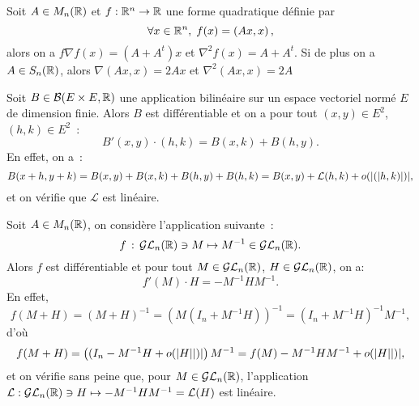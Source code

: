 \begin{exemple}
Soit \(A\in M_n(\mathbb{R})\) et \(f:\mathbb{R}^n\to\mathbb{R}\) une forme quadratique définie par 
\begin{equation*}
\forall x\in\mathbb{R}^n,\; f(x) = \left( Ax,x\right),
\end{equation*}
alors on a \(f\nabla f(x) = (A + A^{t})x\) et \(\nabla^2 f(x) = A + A^{t}\). Si de plus on a \(A\in S_n(\mathbb{R})\), alors \(\nabla \left(Ax,x\right) = 2Ax\) et \(\nabla^2 \left(Ax,x\right) = 2A\)
\end{exemple}
\begin{exemple}
Soit \(B\in \mathcal{B}(E\times E, \mathbb{R})\) une application bilinéaire sur un espace vectoriel normé \(E\) de dimension finie. Alors \(B\) est différentiable et on a pour tout \((x,y) \in E^2\), \((h,k)\in E^2\)~:
\begin{equation*}
B'(x,y)\cdot(h,k) = B(x, k) + B(h, y).
\end{equation*}
En effet, on a~:
\begin{equation*}
B(x+h, y+k) = B(x, y) + B(x, k) + B(h, y) + B(h, k) = B(x, y) + \mathcal{L}(h,k) + o(\mathopen{}\left|(\right|\mathclose{}h,k)\mathopen{}\left|)\right|\mathclose{},
\end{equation*}
et on vérifie que \(\mathcal{L}\) est linéaire.\\
\end{exemple}

\begin{exemple}
Soit \(A\in M_n(\mathbb{R})\), on considère l'application suivante~:
\begin{equation*}
f\,:\, \mathcal{GL}_n(\mathbb{R}) \ni M \mapsto M^{-1}\in \mathcal{GL}_n(\mathbb{R}).
\end{equation*}
Alors \(f\) est différentiable et pour tout \(M\in \mathcal{GL}_n(\mathbb{R})\), \(H\in \mathcal{GL}_n(\mathbb{R})\), on a:
\begin{equation*}
f'(M)\cdot H = -M^{-1}HM^{-1}.
\end{equation*}
En effet,
\begin{equation*}
f(M+H) = (M+H)^{-1} = \left(M^{}(I_n + M^{-1}H)\right)^{-1} = (I_n + M^{-1}H)^{-1}M^{-1},
\end{equation*}
d'où
\begin{equation*}
f(M+H) = \left( (I_n - M^{-1}H + o(\mathopen{}\left|H\right|\mathclose{}\mathopen{}\left|)\right|\mathclose{}  \right)M^{-1} = f(M)  - M^{-1}HM^{-1} + o(\mathopen{}\left|H\right|\mathclose{}\mathopen{}\left|)\right|\mathclose{},
\end{equation*}
et on vérifie sans peine que, pour \(M\in\mathcal{GL}_n(\mathbb{R})\),  l'application \(\mathcal{L}: \mathcal{GL}_n(\mathbb{R}) \ni H \mapsto - M^{-1}HM^{-1} = \mathcal{L}(H)\) est linéaire.\\
\end{exemple}



